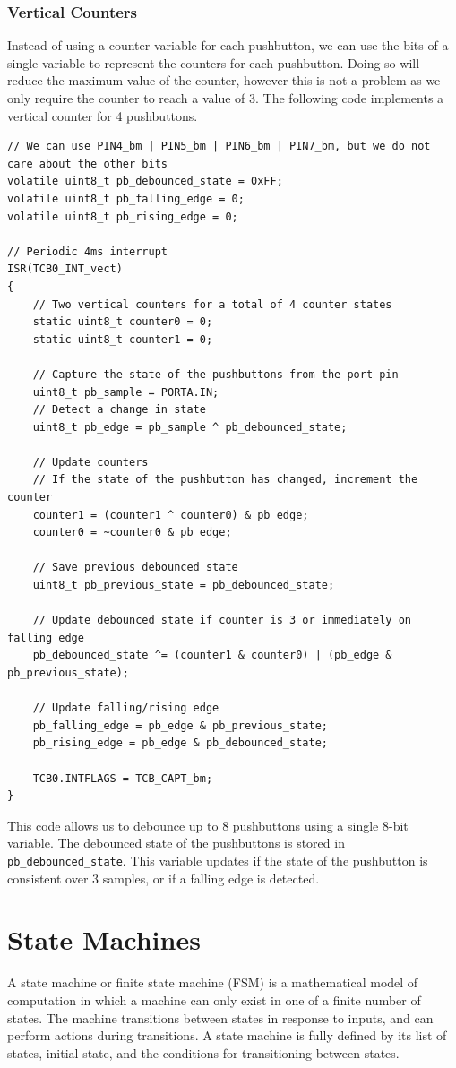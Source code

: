 \documentclass[a4paper]{report}
\begin{document}
\subsection{Vertical Counters}
Instead of using a counter variable for each pushbutton, we can use the
bits of a single variable to represent the counters for each pushbutton.
Doing so will reduce the maximum value of the counter, however this is
not a problem as we only require the counter to reach a value of 3.
The following code implements a vertical counter for 4 pushbuttons.
\begin{verbatim}
// We can use PIN4_bm | PIN5_bm | PIN6_bm | PIN7_bm, but we do not care about the other bits
volatile uint8_t pb_debounced_state = 0xFF;
volatile uint8_t pb_falling_edge = 0;
volatile uint8_t pb_rising_edge = 0;

// Periodic 4ms interrupt
ISR(TCB0_INT_vect)
{
    // Two vertical counters for a total of 4 counter states
    static uint8_t counter0 = 0;
    static uint8_t counter1 = 0;

    // Capture the state of the pushbuttons from the port pin
    uint8_t pb_sample = PORTA.IN;
    // Detect a change in state
    uint8_t pb_edge = pb_sample ^ pb_debounced_state;

    // Update counters
    // If the state of the pushbutton has changed, increment the counter
    counter1 = (counter1 ^ counter0) & pb_edge;
    counter0 = ~counter0 & pb_edge;

    // Save previous debounced state
    uint8_t pb_previous_state = pb_debounced_state;

    // Update debounced state if counter is 3 or immediately on falling edge
    pb_debounced_state ^= (counter1 & counter0) | (pb_edge & pb_previous_state);

    // Update falling/rising edge
    pb_falling_edge = pb_edge & pb_previous_state;
    pb_rising_edge = pb_edge & pb_debounced_state;

    TCB0.INTFLAGS = TCB_CAPT_bm;
}
\end{verbatim}
This code allows us to debounce up to 8 pushbuttons using a single 8-bit
variable. The debounced state of the pushbuttons is stored in \texttt{pb_debounced_state}.
This variable updates if the state of the pushbutton is consistent over 3 samples,
or if a falling edge is detected.
\chapter{State Machines}
A state machine or finite state machine (FSM) is a mathematical model of computation in which a machine can only exist in one of a finite
number of states. The machine transitions between states in response to inputs, and can perform actions during transitions.
A state machine is fully defined by its list of states, initial state,
and the conditions for transitioning between states.
\end{document}
